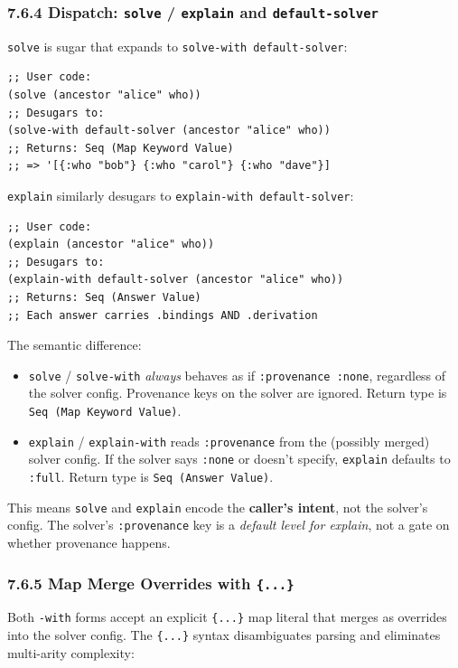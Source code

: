 \documentclass[11pt]{article}
\begin{document}
\subsubsection{7.6.4 Dispatch: \texttt{solve} / \texttt{explain} and \texttt{default-solver}}
\label{sec:orgc42f83c}

\texttt{solve} is sugar that expands to \texttt{solve-with default-solver}:

\begin{verbatim}
;; User code:
(solve (ancestor "alice" who))
;; Desugars to:
(solve-with default-solver (ancestor "alice" who))
;; Returns: Seq (Map Keyword Value)
;; => '[{:who "bob"} {:who "carol"} {:who "dave"}]
\end{verbatim}

\texttt{explain} similarly desugars to \texttt{explain-with default-solver}:

\begin{verbatim}
;; User code:
(explain (ancestor "alice" who))
;; Desugars to:
(explain-with default-solver (ancestor "alice" who))
;; Returns: Seq (Answer Value)
;; Each answer carries .bindings AND .derivation
\end{verbatim}

The semantic difference:
\begin{itemize}
\item \texttt{solve} / \texttt{solve-with} \emph{always} behaves as if \texttt{:provenance :none},
regardless of the solver config. Provenance keys on the solver are ignored.
Return type is \texttt{Seq (Map Keyword Value)}.
\item \texttt{explain} / \texttt{explain-with} reads \texttt{:provenance} from the (possibly merged)
solver config. If the solver says \texttt{:none} or doesn't specify, \texttt{explain}
defaults to \texttt{:full}. Return type is \texttt{Seq (Answer Value)}.
\end{itemize}

This means \texttt{solve} and \texttt{explain} encode the \textbf{caller's intent}, not the
solver's config. The solver's \texttt{:provenance} key is a \emph{default level for
explain}, not a gate on whether provenance happens.
\subsubsection{7.6.5 Map Merge Overrides with \texttt{\{...\}}}
\label{sec:org93e575e}

Both \texttt{-with} forms accept an explicit \texttt{\{...\}} map literal that merges as
overrides into the solver config. The \texttt{\{...\}} syntax disambiguates parsing
and eliminates multi-arity complexity:
\end{document}
